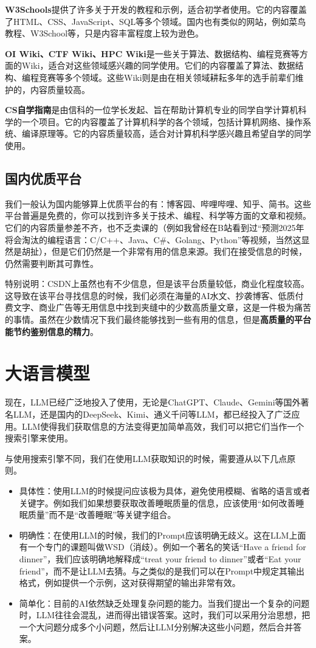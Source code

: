 \documentclass[../main.tex]{subfiles}
\begin{document}
\textbf{W3Schools}提供了许多关于开发的教程和示例，适合初学者使用。它的内容覆盖了HTML、CSS、JavaScript、SQL等多个领域。国内也有类似的网站，例如菜鸟教程、W3School等，只是内容丰富程度上较为逊色。

\textbf{OI Wiki、CTF Wiki、HPC Wiki}是一些关于算法、数据结构、编程竞赛等方面的Wiki，适合对这些领域感兴趣的同学使用。它们的内容覆盖了算法、数据结构、编程竞赛等多个领域。这些Wiki则是由在相关领域耕耘多年的选手前辈们维护的，内容质量较高。

\textbf{CS自学指南}是由信科的一位学长发起、旨在帮助计算机专业的同学自学计算机科学的一个项目。它的内容覆盖了计算机科学的各个领域，包括计算机网络、操作系统、编译原理等。它的内容质量较高，适合对计算机科学感兴趣且希望自学的同学使用。

\subsection{国内优质平台}

我们一般认为国内能够算上优质平台的有：博客园、哔哩哔哩、知乎、简书。这些平台普遍是免费的，你可以找到许多关于技术、编程、科学等方面的文章和视频。它们的内容质量参差不齐，也不乏卖课的（例如我曾经在B站看到过“预测2025年将会淘汰的编程语言：C/C++、Java、C\#、Golang、Python”等视频，当然这显然是胡扯），但是它们仍然是一个非常有用的信息来源。我们在接受信息的时候，仍然需要判断其可靠性。

特别说明：CSDN上虽然也有不少信息，但是该平台质量较低，商业化程度较高。这导致在该平台寻找信息的时候，我们必须在海量的AI水文、抄袭博客、低质付费文字、商业广告等无用信息中找到夹缝中的少数高质量文章，这是一件极为痛苦的事情。虽然在少数情况下我们最终能够找到一些有用的信息，但是\textbf{高质量的平台能节约鉴别信息的精力}。

\section{大语言模型}

现在，LLM已经广泛地投入了使用，无论是ChatGPT、Claude、Gemini等国外著名LLM，还是国内的DeepSeek、Kimi、通义千问等LLM，都已经投入了广泛应用。LLM使得我们获取信息的方法变得更加简单高效，我们可以把它们当作一个搜索引擎来使用。

与使用搜索引擎不同，我们在使用LLM获取知识的时候，需要遵从以下几点原则。

\begin{itemize}
    \item 具体性：使用LLM的时候提问应该极为具体，避免使用模糊、省略的语言或者关键字。例如我们如果想要获取改善睡眠质量的信息，应该使用“如何改善睡眠质量”而不是“改善睡眠”等关键字组合。
    \item 明确性：在使用LLM的时候，我们的Prompt应该明确无歧义。这在LLM上面有一个专门的课题叫做WSD（消歧）。例如一个著名的笑话“Have a friend for dinner”，我们应该明确地解释成“treat your friend to dinner”或者“Eat your friend”，而不是让LLM去猜。与之类似的是我们可以在Prompt中规定其输出格式，例如提供一个示例，这对获得期望的输出非常有效。
    \item 简单化：目前的AI依然缺乏处理复杂问题的能力。当我们提出一个复杂的问题时，LLM往往会混乱，进而得出错误答案。这时，我们可以采用分治思想，把一个大问题分成多个小问题，然后让LLM分别解决这些小问题，然后合并答案。
\end{itemize}
\end{document}
